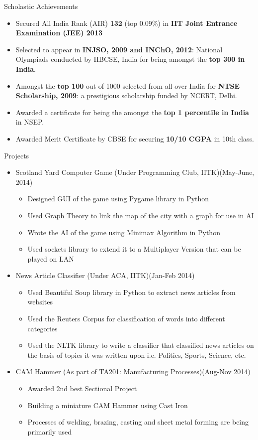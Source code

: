 \documentclass{article}
\begin{document}
{\Large Scholastic Achievements}
	\begin{itemize}
\item Secured All India Rank (AIR) \textbf {132} (top 0.09\%) in \textbf {IIT Joint Entrance Examination (JEE) 2013} 
\item Selected to appear in \textbf{INJSO, 2009 and INChO, 2012}: National Olympiads conducted by HBCSE, India for being amongst the \textbf{top 300 in India}.
\item Amongst the \textbf{top 100} out of 1000 selected from all over India for \textbf{NTSE Scholarship, 2009}: a prestigious scholarship funded by NCERT, Delhi.
\item Awarded a certificate for being the amongst the \textbf{top 1 percentile in India} in  NSEP.
\item Awarded Merit Certificate by CBSE for securing \textbf{10/10 CGPA} in 10th class.
	\end{itemize}
\vspace{10pt}
{\Large Projects}
\begin{itemize}
\item {\large Scotland Yard Computer Game}\newline
(Under Programming Club, IITK)\hfill (May-June, 2014)
	\begin{itemize}
	\item Designed GUI of the game using Pygame library in Python
	\item Used Graph Theory to link the map of the city with a graph for use in AI
	\item Wrote the AI of the game using Minimax Algorithm in Python

	\item Used sockets library to extend it to a Multiplayer Version that can be played on LAN
	\end{itemize}
	
\item {\large News Article Classifier}\newline
(Under ACA, IITK)\hfill (Jan-Feb 2014)
	\begin{itemize}
	\item Used Beautiful Soup library in Python to extract news articles from websites
	\item Used the Reuters Corpus for classification of words into different categories
	\item Used the NLTK library to write a classifier that classified news articles on the basis of topics it was written upon i.e. Politics, Sports, Science, etc.
	\end{itemize}
	
\item {\large CAM Hammer}\newline	
(As part of TA201: Manufacturing Processes)\hfill (Aug-Nov 2014)
	\begin{itemize}
	\item Awarded 2nd best Sectional Project
	\item Building a miniature CAM Hammer using Cast Iron
	\item Processes of welding, brazing, casting and sheet metal forming are being primarily used
	\end{itemize}
	\end{itemize}
\end{document}

